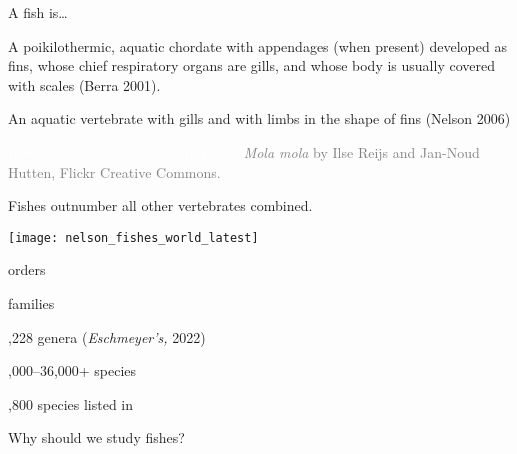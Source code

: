 \documentclass[t,handout]{beamer}  %
\begin{document}
\begin{frame}[t,plain]{A fish is\dots}

	\hangpara A poikilothermic, aquatic chordate with appendages (when present) developed as fins, whose chief respiratory organs are gills, and whose body is usually covered with scales (Berra 2001).

	\hangpara An aquatic vertebrate with gills and with limbs in the shape of fins (Nelson 2006)

\end{frame}

{
\begin{frame}[b,plain]{\textcolor{white}{How many species of fishes are there?}}
	\hfill\tiny\textcolor{gray}{\textit{Mola mola} by Ilse Reijs and Jan-Noud Hutten, Flickr Creative Commons.}
\end{frame}
}

\begin{frame}[t,plain]{Fishes outnumber all other vertebrates combined.}
\begin{multicols}{2}
	\begin{center}
		\texttt{[image: nelson\_fishes\_world\_latest]} \\
	\end{center}
	
	\columnbreak
	
	 orders

	 families
		
	,228 genera (\textit{Eschmeyer's,} 2022)
		
	,000–36,000+ species
	
	,800 species listed in {\small{}}
		
\end{multicols}
\end{frame}

{
\begin{frame}[t,plain]{Why should we study fishes?}
\end{frame}
}
\end{document}
